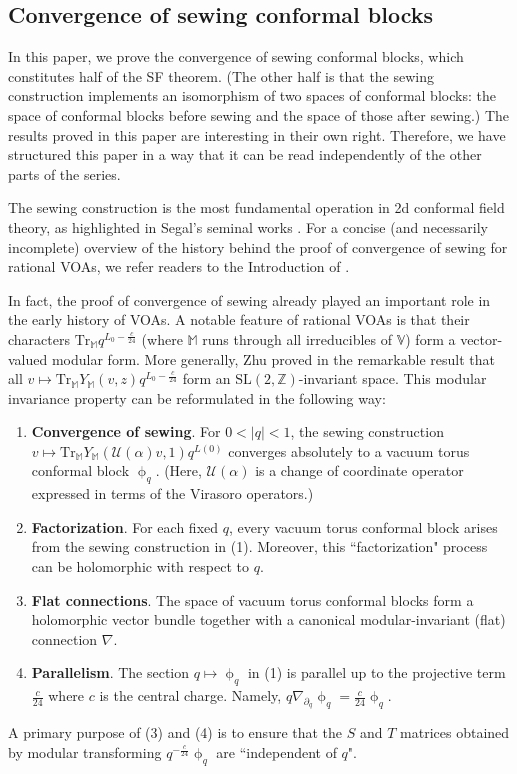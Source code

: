 \documentclass[11pt,b5paper,notitlepage]{article}
\theoremstyle{definition}
\theoremstyle{plain}
\newcommand{\mc}{\mathcal}
\newcommand{\Tr}{\mathrm{Tr}}
\newcommand{\Vbb}{\mathbb V}
\newcommand{\Mbb}{\mathbb M}
\newcommand{\Zbb}{\mathbb Z}
\newcommand{\<}{\left\langle}
\renewcommand{\>}{\right\rangle}
\numberwithin{equation}{subsection}
\begin{document}
\subsection{Convergence of sewing conformal blocks}\label{lbb62}





In this paper, we prove the convergence of sewing conformal blocks, which constitutes half of the SF theorem. (The other half is that the sewing construction implements an isomorphism of two spaces of conformal blocks: the space of conformal blocks before sewing and the space of those after sewing.) The results proved in this paper are interesting in their own right. Therefore, we have structured this paper in a way that it can be read independently of the other parts of the series.


The sewing construction is the most fundamental operation in 2d conformal field theory, as highlighted in Segal's seminal works \cite{Segal-CFT1,Segal-CFT2}. For a concise (and necessarily incomplete) overview of the history behind the proof of convergence of sewing for rational VOAs, we refer readers to the Introduction of \cite{Gui-sewingconvergence}.



In fact, the proof of convergence of sewing already played an important role in the early history of VOAs. A notable feature of rational VOAs is that their characters $\Tr_\Mbb q^{L_0-\frac c{24}}$ (where $\Mbb$ runs through all irreducibles of $\Vbb$) form a vector-valued modular form. More generally, Zhu proved in \cite{Zhu-modular-invariance} the remarkable result that all $v\mapsto \Tr_\Mbb Y_\Mbb(v,z)q^{L_0-\frac c{24}}$ form an $\mathrm{SL}(2,\Zbb)$-invariant space. This modular invariance property can be reformulated in the following way:

\begin{enumerate}[label=(\arabic*)]
\item \textbf{Convergence of sewing}. For $0<|q|<1$, the sewing construction $v\mapsto \Tr_\Mbb Y_\Mbb(\mc U(\alpha)v,1)q^{L(0)}$ converges absolutely to a vacuum torus conformal block $\upphi_q$. (Here, $\mc U(\alpha)$ is a change of coordinate operator expressed in terms of the Virasoro operators.)
\item \textbf{Factorization}. For each fixed $q$, every vacuum torus conformal block arises from the sewing construction in (1). Moreover, this ``factorization" process can be holomorphic with respect to $q$.
\item \textbf{Flat connections}. The space of vacuum torus conformal blocks form a holomorphic vector bundle together with a canonical modular-invariant (flat) connection $\nabla$. 
\item \textbf{Parallelism}. The section $q\mapsto \upphi_q$ in (1) is parallel up to the projective term $\frac c{24}$ where $c$ is the central charge. Namely, $q\nabla_{\partial_q}\upphi_q=\frac c{24}\upphi_q$.
\end{enumerate}
A primary purpose of (3) and (4) is to ensure that the $S$ and $T$ matrices obtained by modular transforming $q^{-\frac c{24}}\upphi_q$ are ``independent of $q$".
\end{document}

